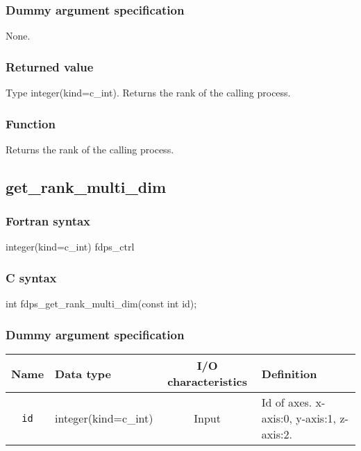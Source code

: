 \subsubsection*{Dummy argument specification}
None.

\subsubsection*{Returned value}
Type integer(kind=c\_int). Returns the rank of the calling process.

\subsubsection*{Function}
Returns the rank of the calling process.
\clearpage

\subsection{get\_rank\_multi\_dim}
\subsubsection*{Fortran syntax}
\begin{screen}
\begin{spverbatim}  
integer(kind=c_int) fdps_ctrl%
\end{spverbatim}
\end{screen}

\subsubsection*{C syntax}
\begin{screen}
\begin{spverbatim}  
int fdps_get_rank_multi_dim(const int id);
\end{spverbatim}
\end{screen}

\subsubsection*{Dummy argument specification}
\begin{table}[h]
\begin{tabularx}{\linewidth}{cXcX}
\toprule
\rowcolor{Snow2}
Name & Data type & I/O characteristics & Definition \\
\midrule
\verb|id| & integer(kind=c\_int) & Input & Id of axes. x-axis:0, y-axis:1, z-axis:2.\\
\bottomrule
\end{tabularx}
\end{table}

